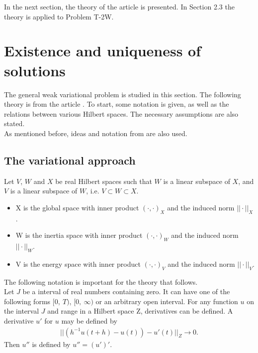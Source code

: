\documentclass[../../main.tex]{subfiles}
\begin{document}
In the next section, the theory of the article \cite{VV02} is presented. In Section 2.3 the theory is applied to Problem T-2W.

\section{Existence and uniqueness of solutions}\label{sec:existence:ExistenceAndUniqueness}
The general weak variational problem is studied in this section. The following theory is from the article \cite{VV02}. To start, some notation is given, as well as the relations between various Hilbert spaces. The necessary assumptions are also stated.\\

As mentioned before, ideas and notation from \cite{VS19} are also used.

\subsection{The variational approach}\label{ssec:existence:VariationlApproach}
Let $V$, $W$ and $X$ be real Hilbert spaces such that $W$ is a linear subspace of $X$, and $V$ is a linear subspace of $W$, i.e. $V \subset W \subset X$.
\begin{itemize}
	\item[] X is the global space with inner product $(\cdot,\cdot)_X$ and the induced norm $||\cdot||_X$.
	\item[] W is the inertia space with inner product $(\cdot,\cdot)_W$ and the induced norm $||\cdot||_W$.
	\item[] V is the energy space with inner product $(\cdot,\cdot)_V$ and the induced norm $||\cdot||_V$.
\end{itemize} \label{sym:Xspace}\label{sym:Wspace}\label{sym:Vspace}\label{sym:norm}

The following notation is important for the theory that follows.\\

Let $J$ be a interval of real numbers containing zero. It can have one of the following forms $[0,\ T)$, $[0,\ \infty)$ or an arbitrary open interval. For any function $u$ on the interval $J$ and range in a Hilbert space Z, derivatives can be defined. A derivative $u'$ for $u$ may be defined by
\begin{eqnarray*}
	||(h^{-1} u(t+h)-u(t))-u'(t)||_Z \rightarrow 0.
\end{eqnarray*} Then $u''$ is defined by $u'' = (u')'$.\\
\end{document}
